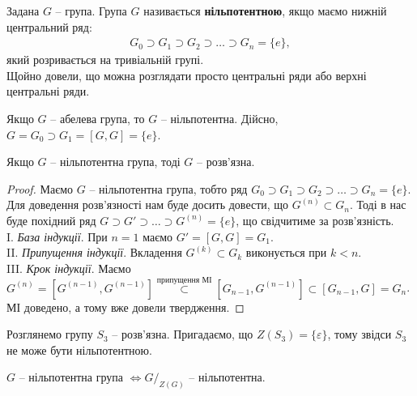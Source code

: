 \documentclass{math_library}
\begin{document}
\begin{definition}
Задана $G$ -- група.
Група $G$ називається \textbf{нільпотентною}, якщо маємо нижній центральний ряд:
\begin{align*}
G_0 \supset G_1 \supset G_2 \supset \dots \supset G_n = \{e\},
\end{align*}
який розривається на тривіальній групі.\\
Щойно довели, що можна розглядати просто центральні ряди або верхні центральні ряди.
\end{definition}

\begin{remark}
Якщо $G$ -- абелева група, то $G$ -- нільпотентна. Дійсно, $G = G_0 \supset G_1 = [G,G] = \{e\}$.
\end{remark}

\begin{proposition}
Якщо $G$ -- нільпотентна група, тоді $G$ -- розв'язна. 
\end{proposition}

\begin{proof}
Маємо $G$ -- нільпотентна група, тобто ряд $G_0 \supset G_1 \supset G_2 \supset \dots \supset G_n = \{e\}$. Для доведення розв'язності нам буде досить довести, що $G^{(n)} \subset G_n$. Тоді в нас буде похідний ряд $G \supset G' \supset \dots \supset G^{(n)} = \{e\}$, що свідчитиме за розв'язність.\\
I. \textit{База індукції}. При $n = 1$ маємо $G' = [G,G] = G_1$.\\
II. \textit{Припущення індукції}. Вкладення $G^{(k)} \subset G_k$ виконується при $k < n$.\\
III. \textit{Крок індукції}. Маємо $G^{(n)} = [G^{(n-1)},G^{(n-1)}] \overset{\text{припущення МІ}}{\subset} [G_{n-1}, G^{(n-1)}] \subset [G_{n-1}, G] = G_n$.\\
МІ доведено, а тому вже довели твердження.
\end{proof}

\begin{example}
Розглянемо групу $S_3$ -- розв'язна. Пригадаємо, що $Z(S_3) = \{\varepsilon\}$, тому звідси $S_3$ не може бути нільпотентною.
\end{example}

\begin{proposition}
$G$ -- нільпотентна група $\iff G/_{Z(G)}$ -- нільпотентна.
\end{proposition}
\end{document}
